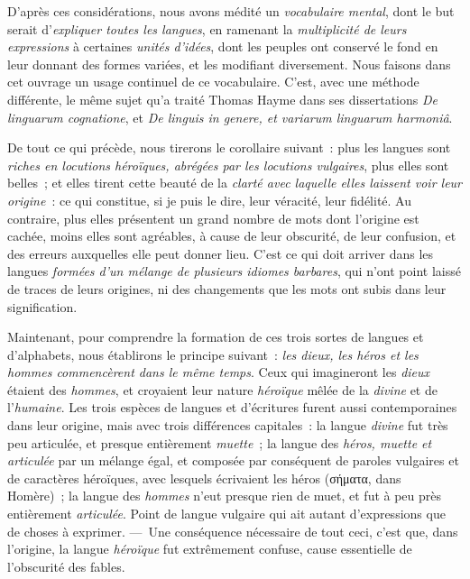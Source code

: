 \documentclass[french,twoside]{book} %
\begin{document}
D’après ces considérations, nous avons médité un {\itshape vocabulaire mental}, dont le but serait d’{\itshape expliquer toutes les langues}, en ramenant la {\itshape multiplicité de leurs expressions} à certaines {\itshape unités d’idées}, dont les peuples ont conservé le fond en leur donnant des formes variées, et les modifiant diversement. Nous faisons dans cet ouvrage un usage continuel de ce vocabulaire. C’est, avec une méthode différente, le même sujet qu’a traité Thomas Hayme  dans ses dissertations {\itshape De linguarum cognatione}, et {\itshape De linguis in genere, et variarum linguarum harmoniâ}.\par
De tout ce qui précède, nous tirerons le corollaire suivant : plus les langues sont {\itshape riches en locutions héroïques, abrégées par les locutions vulgaires}, plus elles sont belles ; et elles tirent cette beauté de la {\itshape clarté avec laquelle elles laissent voir leur origine} : ce qui constitue, si je puis le dire, leur véracité, leur fidélité. Au contraire, plus elles présentent un grand nombre de mots dont l’origine est cachée, moins elles sont agréables, à cause de leur obscurité, de leur confusion, et des erreurs auxquelles elle peut donner lieu. C’est ce qui doit arriver dans les langues {\itshape formées d’un mélange de plusieurs idiomes barbares}, qui n’ont point laissé de traces de leurs origines, ni des changements que les mots ont subis dans leur signification.\par
\par
Maintenant, pour comprendre la formation de ces trois sortes de langues et d’alphabets, nous établirons le principe suivant : {\itshape les dieux, les héros et les hommes commencèrent dans le même temps}. Ceux qui imagineront les {\itshape dieux} étaient des {\itshape hommes}, et croyaient leur nature {\itshape héroïque} mêlée de la {\itshape divine} et de l’{\itshape humaine}. Les trois espèces de langues et d’écritures furent aussi contemporaines dans leur origine, mais avec trois différences capitales : la langue {\itshape divine} fut très peu articulée, et presque entièrement {\itshape muette} ; la langue des {\itshape héros, muette et articulée} par un mélange égal, et composée par conséquent de  paroles vulgaires et de caractères héroïques, avec lesquels écrivaient les héros (σήματα, dans Homère) ; la langue des {\itshape hommes} n’eut presque rien de muet, et fut à peu près entièrement {\itshape articulée}. Point de langue vulgaire qui ait autant d’expressions que de choses à exprimer. — Une conséquence nécessaire de tout ceci, c’est que, dans l’origine, la langue {\itshape héroïque} fut extrêmement confuse, cause essentielle de l’obscurité des fables.\par
\end{document}
